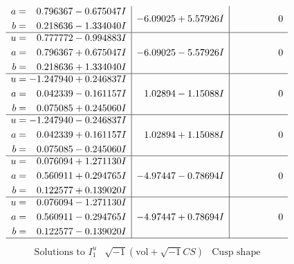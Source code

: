 \documentclass[1p]{elsarticle_modified}
\theoremstyle{definition}
\newcommand{\I}{\sqrt{-1}}
\begin{document}
$$\begin{array}{c|c|c}
\begin{aligned}
a &= \phantom{-}0.796367 - 0.675047 I \\
b &= \phantom{-}0.218636 - 1.334040 I\end{aligned}
 & -6.09025 + 5.57926 I & \phantom{-0.000000 } 0 \\ \hline\begin{aligned}
u &= \phantom{-}0.777772 - 0.994883 I \\
a &= \phantom{-}0.796367 + 0.675047 I \\
b &= \phantom{-}0.218636 + 1.334040 I\end{aligned}
 & -6.09025 - 5.57926 I & \phantom{-0.000000 } 0 \\ \hline\begin{aligned}
u &= -1.247940 + 0.246837 I \\
a &= \phantom{-}0.042339 - 0.161157 I \\
b &= \phantom{-}0.075085 + 0.245060 I\end{aligned}
 & \phantom{-}1.02894 - 1.15088 I & \phantom{-0.000000 } 0 \\ \hline\begin{aligned}
u &= -1.247940 - 0.246837 I \\
a &= \phantom{-}0.042339 + 0.161157 I \\
b &= \phantom{-}0.075085 - 0.245060 I\end{aligned}
 & \phantom{-}1.02894 + 1.15088 I & \phantom{-0.000000 } 0 \\ \hline\begin{aligned}
u &= \phantom{-}0.076094 + 1.271130 I \\
a &= \phantom{-}0.560911 + 0.294765 I \\
b &= \phantom{-}0.122577 + 0.139020 I\end{aligned}
 & -4.97447 - 0.78694 I & \phantom{-0.000000 } 0 \\ \hline\begin{aligned}
u &= \phantom{-}0.076094 - 1.271130 I \\
a &= \phantom{-}0.560911 - 0.294765 I \\
b &= \phantom{-}0.122577 - 0.139020 I\end{aligned}
 & -4.97447 + 0.78694 I & \phantom{-0.000000 } 0\\
 \hline 
 \end{array}$$\newpage$$\begin{array}{c|c|c}  
\text{Solutions to }I^u_{1}& \I (\text{vol} + \sqrt{-1}CS) & \text{Cusp shape}\\
 \hline 
\begin{aligned}

\end{aligned}
\end{array}$$
\end{document}
